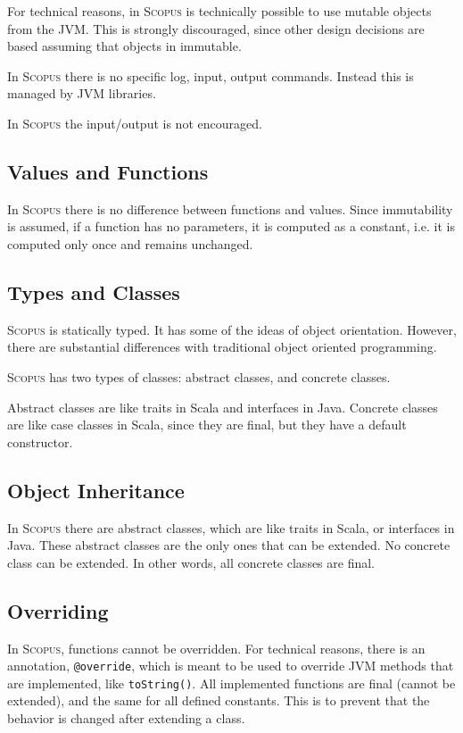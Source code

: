 \documentclass[12pt,a4paper]{article}
\makeatletter
\newcommand{\srccode}[1]{\texttt{{#1}}}
\newcommand{\annotation}[1]{{\color{brown}\srccode{#1}}\xspace}
\newcommand{\soverride}{\annotation{@override}}
\newcommand{\Scopus}{\textsc{Scopus}\xspace}
\makeatother
\begin{document}
    For technical reasons, in \Scopus is technically possible to use mutable objects from the JVM.
    This is strongly discouraged, since other design decisions are based assuming that objects in immutable.

    In \Scopus there is no specific log, input, output commands.
    Instead this is managed by JVM libraries.

    In \Scopus the input/output is not encouraged.

    \subsection{Values and Functions}

    In \Scopus there is no difference between functions and values.
    Since immutability is assumed, if a function has no parameters, it is computed as a constant, i.e. it is computed only once and remains unchanged.

    \subsection{Types and Classes}

    \Scopus is statically typed.
    It has some of the ideas of object orientation.
    However, there are substantial differences with traditional object oriented programming.

    \Scopus has two types of classes: abstract classes, and concrete classes.

    Abstract classes are like traits in Scala and interfaces in Java.
    Concrete classes are like case classes in Scala, since they are final, but they have a default constructor.

    \subsection{Object Inheritance}

    In \Scopus there are abstract classes, which are like traits in Scala, or interfaces in Java.
    These abstract classes are the only ones that can be extended.
    No concrete class can be extended.
    In other words, all concrete classes are final.

    \subsection{Overriding}

    In \Scopus, functions cannot be overridden.
    For technical reasons, there is an annotation, \soverride, which is meant to be used to override JVM methods that are implemented, like \srccode{toString()}.
    All implemented functions are final (cannot be extended), and the same for all defined constants.
    This is to prevent that the behavior is changed after extending a class.
\end{document}
